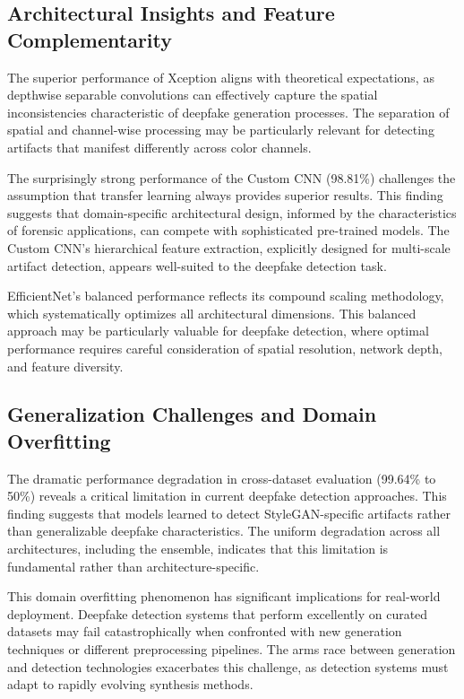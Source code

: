 \documentclass[conference]{IEEEtran}
\begin{document}
\subsection{Architectural Insights and Feature Complementarity}

The superior performance of Xception aligns with theoretical expectations, as depthwise separable convolutions can effectively capture the spatial inconsistencies characteristic of deepfake generation processes. The separation of spatial and channel-wise processing may be particularly relevant for detecting artifacts that manifest differently across color channels.

The surprisingly strong performance of the Custom CNN (98.81\%) challenges the assumption that transfer learning always provides superior results. This finding suggests that domain-specific architectural design, informed by the characteristics of forensic applications, can compete with sophisticated pre-trained models. The Custom CNN's hierarchical feature extraction, explicitly designed for multi-scale artifact detection, appears well-suited to the deepfake detection task.

EfficientNet's balanced performance reflects its compound scaling methodology, which systematically optimizes all architectural dimensions. This balanced approach may be particularly valuable for deepfake detection, where optimal performance requires careful consideration of spatial resolution, network depth, and feature diversity.

\subsection{Generalization Challenges and Domain Overfitting}

The dramatic performance degradation in cross-dataset evaluation (99.64\% to 50\%) reveals a critical limitation in current deepfake detection approaches. This finding suggests that models learned to detect StyleGAN-specific artifacts rather than generalizable deepfake characteristics. The uniform degradation across all architectures, including the ensemble, indicates that this limitation is fundamental rather than architecture-specific.

This domain overfitting phenomenon has significant implications for real-world deployment. Deepfake detection systems that perform excellently on curated datasets may fail catastrophically when confronted with new generation techniques or different preprocessing pipelines. The arms race between generation and detection technologies exacerbates this challenge, as detection systems must adapt to rapidly evolving synthesis methods.
\end{document}
